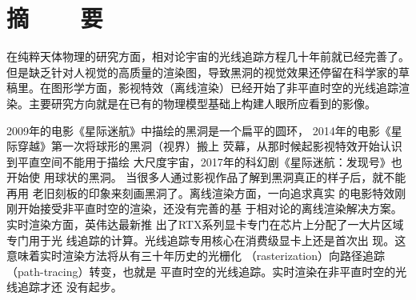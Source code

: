 %
%
%
%
%

\topskip=0pt

\vspace*{-7mm}

\begin{center}
  \heiti{}\textbf{\thesisTitle}
\end{center}

\vspace*{2mm}

{\let\clearpage\relax \chapter*{\textmd{摘~~~~要}}}
\setcounter{page}{1}

\vspace*{1mm}

\setlength{\parskip}{0em}

在纯粹天体物理的研究方面，相对论宇宙的光线追踪方程几十年前就已经完善了。但是缺乏针对人视觉的高质量的渲染图，导致黑洞的视觉效果还停留在科学家的草稿里。在图形学方面，影视特效（离线渲染）已经开始了非平直时空的光线追踪渲染。主要研究方向就是在已有的物理模型基础上构建人眼所应看到的影像。

2009年的电影《星际迷航》中描绘的黑洞是一个扁平的圆环，
2014年的电影《星际穿越》第一次将球形的黑洞（视界）搬上
荧幕，从那时候起影视特效开始认识到平直空间不能用于描绘
大尺度宇宙，2017年的科幻剧《星际迷航：发现号》也开始使
用球状的黑洞。
当很多人通过影视作品了解到黑洞真正的样子后，就不能再用
老旧刻板的印象来刻画黑洞了。离线渲染方面，一向追求真实
的电影特效刚刚开始接受非平直时空的渲染，还没有完善的基
于相对论的离线渲染解决方案。实时渲染方面，英伟达最新推
出了RTX系列显卡专门在芯片上分配了一大片区域专门用于光
线追踪的计算。光线追踪专用核心在消费级显卡上还是首次出
现。这意味着实时渲染方法将从有三十年历史的光栅化
（rasterization）向路径追踪（path-tracing）转变，也就是
平直时空的光线追踪。实时渲染在非平直时空的光线追踪才还
没有起步。

